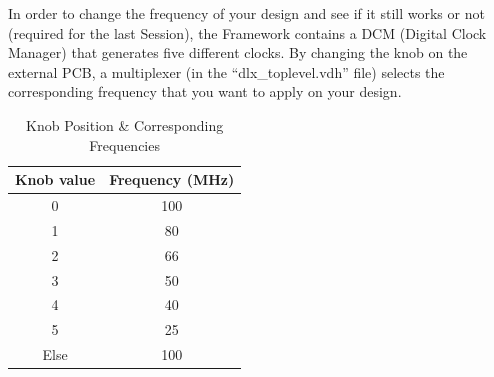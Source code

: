 In order to change the frequency of your design and see if it still
works or not (required for the last Session), the Framework contains a
DCM (Digital Clock Manager) that generates five different clocks. By
changing the knob on the external PCB, a multiplexer (in the
``dlx\_toplevel.vdh'' file) selects the corresponding frequency that you
want to apply on your design.
\begin{table}[!htb]
	\centering
	\begin{tabular}{|c|c|}
		\hline
		\textbf{Knob value} & \textbf{Frequency (MHz)} \\ \hline
		0                   & 100                      \\ \hline
		1                   & 80                       \\ \hline
		2                   & 66                       \\ \hline
		3                   & 50                       \\ \hline
		4                   & 40                       \\ \hline
		5                   & 25                       \\ \hline
		Else                & 100                      \\ \hline
	\end{tabular}
	\caption{Knob Position \& Corresponding Frequencies}
	\label{fig:fig82}
\end{table}
